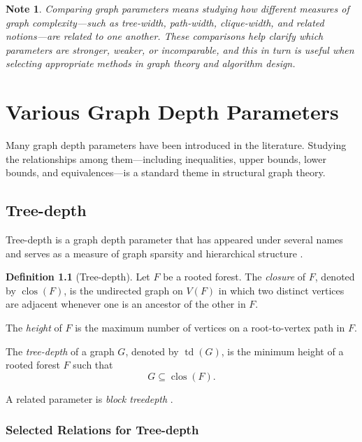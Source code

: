 \documentclass[10pt]{book}
\newtheorem{note}{Note}
\theoremstyle{definition}
\newtheorem{definition}[theorem]{Definition}
\begin{document}
\begin{note}
Comparing graph parameters means studying how different measures of graph complexity---such as tree-width, path-width, clique-width, and related notions---are related to one another.  
These comparisons help clarify which parameters are stronger, weaker, or incomparable, and this in turn is useful when selecting appropriate methods in graph theory and algorithm design.
\end{note}


\newpage

\chapter{Various Graph Depth Parameters}

Many graph depth parameters have been introduced in the literature.  
Studying the relationships among them---including inequalities, upper bounds, lower bounds, and equivalences---is a standard theme in structural graph theory.

\section{Tree-depth}

Tree-depth is a graph depth parameter that has appeared under several names and serves as a measure of graph sparsity and hierarchical structure \cite{90,92,172,173,174}.

\begin{definition}[Tree-depth]
Let \(F\) be a rooted forest.  
The \emph{closure} of \(F\), denoted by \(\operatorname{clos}(F)\), is the undirected graph on \(V(F)\) in which two distinct vertices are adjacent whenever one is an ancestor of the other in \(F\).

The \emph{height} of \(F\) is the maximum number of vertices on a root-to-vertex path in \(F\).

The \emph{tree-depth} of a graph \(G\), denoted by \(\operatorname{td}(G)\), is the minimum height of a rooted forest \(F\) such that
\[
G \subseteq \operatorname{clos}(F).
\]
\end{definition}

A related parameter is \emph{block treedepth} \cite{Giannopoulou2024AGS}.

\subsection{Selected Relations for Tree-depth}
\end{document}
